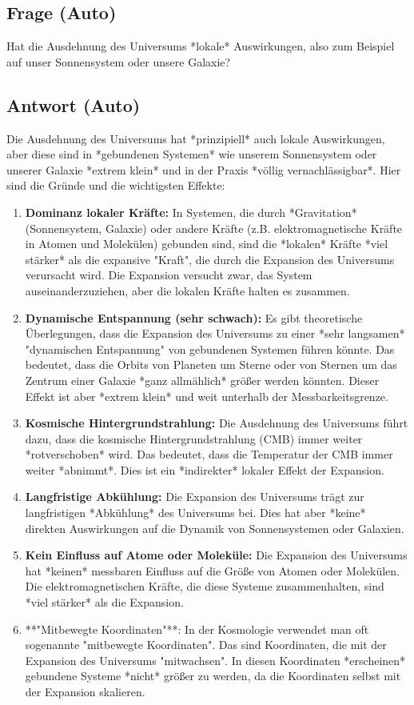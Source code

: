 \documentclass{article}
\begin{document}
	\subsection{Frage (Auto)}
	Hat die Ausdehnung des Universums *lokale* Auswirkungen, also zum Beispiel auf unser Sonnensystem oder unsere Galaxie?
	
	\subsection{Antwort (Auto)}
	Die Ausdehnung des Universums hat *prinzipiell* auch lokale Auswirkungen, aber diese sind in *gebundenen Systemen* wie unserem Sonnensystem oder unserer Galaxie *extrem klein* und in der Praxis *völlig vernachlässigbar*.  Hier sind die Gründe und die wichtigsten Effekte:
	
	\begin{enumerate}
		\item \textbf{Dominanz lokaler Kräfte:} In Systemen, die durch *Gravitation* (Sonnensystem, Galaxie) oder andere Kräfte (z.B. elektromagnetische Kräfte in Atomen und Molekülen) gebunden sind, sind die *lokalen* Kräfte *viel stärker* als die expansive "Kraft", die durch die Expansion des Universums verursacht wird. Die Expansion versucht zwar, das System auseinanderzuziehen, aber die lokalen Kräfte halten es zusammen.
		\item \textbf{Dynamische Entspannung (sehr schwach):} Es gibt theoretische Überlegungen, dass die Expansion des Universums zu einer *sehr langsamen* "dynamischen Entspannung" von gebundenen Systemen führen könnte. Das bedeutet, dass die Orbits von Planeten um Sterne oder von Sternen um das Zentrum einer Galaxie *ganz allmählich* größer werden könnten. Dieser Effekt ist aber *extrem klein* und weit unterhalb der Messbarkeitsgrenze.
		\item \textbf{Kosmische Hintergrundstrahlung:} Die Ausdehnung des Universums führt dazu, dass die kosmische Hintergrundstrahlung (CMB) immer weiter *rotverschoben* wird. Das bedeutet, dass die Temperatur der CMB immer weiter *abnimmt*. Dies ist ein *indirekter* lokaler Effekt der Expansion.
		\item \textbf{Langfristige Abkühlung:} Die Expansion des Universums trägt zur langfristigen *Abkühlung* des Universums bei.  Dies hat aber *keine* direkten Auswirkungen auf die Dynamik von Sonnensystemen oder Galaxien.
		\item \textbf{Kein Einfluss auf Atome oder Moleküle:} Die Expansion des Universums hat *keinen* messbaren Einfluss auf die Größe von Atomen oder Molekülen.  Die elektromagnetischen Kräfte, die diese Systeme zusammenhalten, sind *viel stärker* als die Expansion.
		\item **"Mitbewegte Koordinaten"**: In der Kosmologie verwendet man oft sogenannte "mitbewegte Koordinaten". Das sind Koordinaten, die mit der Expansion des Universums "mitwachsen". In diesen Koordinaten *erscheinen* gebundene Systeme *nicht* größer zu werden, da die Koordinaten selbst mit der Expansion skalieren.
	\end{enumerate}
	
\end{document}
